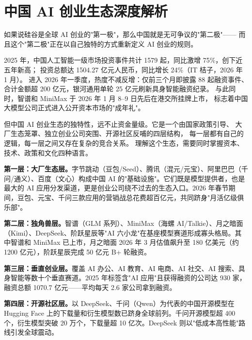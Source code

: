 
\chapter{中国 AI 创业生态深度解析}
\label{ch:china}


如果说硅谷是全球 AI 创业的"第一极"，那么中国就是无可争议的"第二极"——
而且这个"第二极"正在以自己独特的方式重新定义 AI 创业的规则。

2025 年，中国人工智能一级市场投资事件共计 1579 起，同比激增 75\%，创下近五年新高；
投资总额达 1504.27 亿元人民币，同比增长 24\%（IT 桔子，2026 年 1 月）。
进入 2026 年一季度，热度不减反增：仅前三个月即披露 88 起融资事件、
合计金额超 200 亿元，银河通用单轮 25 亿元刷新具身智能融资纪录。
与此同时，智谱和 MiniMax 于 2026 年 1 月 8--9 日先后在港交所挂牌上市，
标志着中国大模型公司正式进入公开资本市场的"成年礼"。

但中国 AI 创业生态的独特性，远不止资金量级。它是一个由国家政策引导、
大厂生态笼罩、独立创业公司突围、开源社区反哺的四层结构，
每一层都有自己的逻辑，每一层之间又存在复杂的竞合关系。
理解这个生态，需要同时掌握资本、技术、政策和文化四种语言。

\begin{corebox}[中国 AI 创业生态的四层结构]
\textbf{第一层：大厂生态层。}字节跳动（豆包/Seed）、腾讯（混元/元宝）、阿里巴巴（千问/通义）、百度（文心）构成中国 AI 的"基础设施"。它们既是模型提供者，也是最大的 AI 应用分发渠道，更是创业公司绕不过去的生态入口。2026 年春节期间，豆包、元宝、千问三款应用的营销战总花费超百亿元，共同跻身"月活亿级俱乐部"。

\textbf{第二层：独角兽层。}智谱（GLM 系列）、MiniMax（海螺 AI/Talkie）、月之暗面（Kimi）、DeepSeek、阶跃星辰等"AI 六小龙"在基座模型赛道形成寡头格局。其中智谱和 MiniMax 已上市，月之暗面 2026 年 3 月估值飙升至 180 亿美元（约 1200 亿元），阶跃星辰完成 50 亿元 B+ 轮融资。

\textbf{第三层：垂直创业层。}覆盖 AI 办公、AI 教育、AI 电商、AI 社交、AI 搜索、具身智能等数十个垂直赛道。2025 年标签含"AI 应用"且获得融资的公司达 930 家，融资总额 1070.7 亿元——平均每天 2.6 家公司拿到融资。

\textbf{第四层：开源社区层。}以 DeepSeek、千问（Qwen）为代表的中国开源模型在 Hugging Face 上的下载量和衍生模型数已跻身全球前列。千问开源模型超 400 个，衍生模型突破 20 万个，下载量超 10 亿次。DeepSeek 则以"低成本高性能"路线引发全球震动。
\end{corebox}

